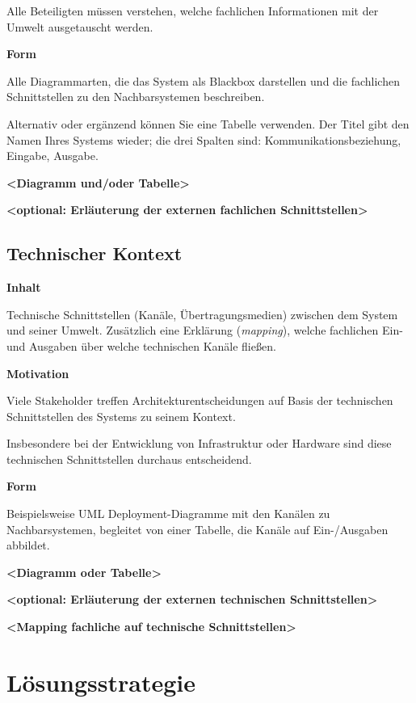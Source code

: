 \documentclass[
]{article}
\begin{document}
Alle Beteiligten müssen verstehen, welche fachlichen Informationen mit
der Umwelt ausgetauscht werden.

\textbf{Form}

Alle Diagrammarten, die das System als Blackbox darstellen und die
fachlichen Schnittstellen zu den Nachbarsystemen beschreiben.

Alternativ oder ergänzend können Sie eine Tabelle verwenden. Der Titel
gibt den Namen Ihres Systems wieder; die drei Spalten sind:
Kommunikationsbeziehung, Eingabe, Ausgabe.

\textbf{\textless Diagramm und/oder Tabelle\textgreater{}}

\textbf{\textless optional: Erläuterung der externen fachlichen
Schnittstellen\textgreater{}}

\hypertarget{_technischer_kontext}{%
\subsection{Technischer Kontext}\label{_technischer_kontext}}

\textbf{Inhalt}

Technische Schnittstellen (Kanäle, Übertragungsmedien) zwischen dem
System und seiner Umwelt. Zusätzlich eine Erklärung (\emph{mapping}),
welche fachlichen Ein- und Ausgaben über welche technischen Kanäle
fließen.

\textbf{Motivation}

Viele Stakeholder treffen Architekturentscheidungen auf Basis der
technischen Schnittstellen des Systems zu seinem Kontext.

Insbesondere bei der Entwicklung von Infrastruktur oder Hardware sind
diese technischen Schnittstellen durchaus entscheidend.

\textbf{Form}

Beispielsweise UML Deployment-Diagramme mit den Kanälen zu
Nachbarsystemen, begleitet von einer Tabelle, die Kanäle auf
Ein-/Ausgaben abbildet.

\textbf{\textless Diagramm oder Tabelle\textgreater{}}

\textbf{\textless optional: Erläuterung der externen technischen
Schnittstellen\textgreater{}}

\textbf{\textless Mapping fachliche auf technische
Schnittstellen\textgreater{}}

\hypertarget{section-solution-strategy}{%
\section{Lösungsstrategie}\label{section-solution-strategy}}
\end{document}
